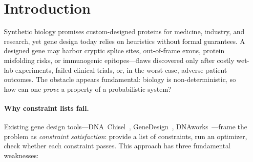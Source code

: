 
\section{Introduction}\label{sec:intro}

Synthetic biology promises custom-designed proteins for medicine,
industry, and research, yet gene design today relies on heuristics
without formal guarantees.
A designed gene may harbor cryptic splice sites, out-of-frame exons,
protein misfolding risks, or immunogenic epitopes---flaws discovered
only after costly wet-lab experiments, failed clinical trials, or, in
the worst case, adverse patient outcomes.
The obstacle appears fundamental: biology is non-deterministic, so how
can one \emph{prove} a property of a probabilistic system?

\paragraph{Why constraint lists fail.}
Existing gene design tools---DNA~Chisel~\cite{piret2020dnachisel},
GeneDesign~\cite{richardson2006genedesign},
DNAworks~\cite{vandenbergh2015dnaworks}---frame the problem as
\emph{constraint satisfaction}: provide a list of constraints, run an
optimizer, check whether each constraint passes.
This approach has three fundamental weaknesses:


